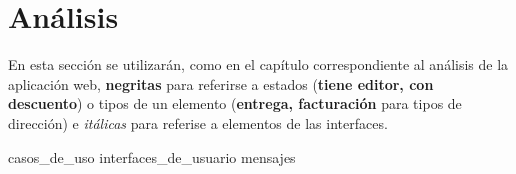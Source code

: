%
%

\section{Análisis}

En esta sección se utilizarán, como en el capítulo correspondiente al análisis
de la aplicación web, \textbf{negritas} para referirse a estados
(\textbf{tiene editor, con descuento}) o tipos de un elemento
(\textbf{entrega, facturación} para tipos de dirección) e \textit{itálicas}
para referise a elementos de las interfaces.

{casos_de_uso}
{interfaces_de_usuario}
{mensajes}
